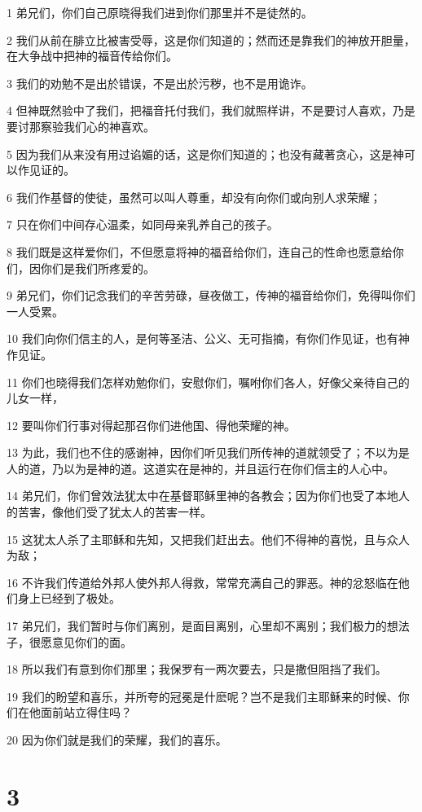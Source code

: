 \par 1 弟兄们，你们自己原晓得我们进到你们那里并不是徒然的。
\par 2 我们从前在腓立比被害受辱，这是你们知道的；然而还是靠我们的神放开胆量，在大争战中把神的福音传给你们。
\par 3 我们的劝勉不是出於错误，不是出於污秽，也不是用诡诈。
\par 4 但神既然验中了我们，把福音托付我们，我们就照样讲，不是要讨人喜欢，乃是要讨那察验我们心的神喜欢。
\par 5 因为我们从来没有用过谄媚的话，这是你们知道的；也没有藏著贪心，这是神可以作见证的。
\par 6 我们作基督的使徒，虽然可以叫人尊重，却没有向你们或向别人求荣耀；
\par 7 只在你们中间存心温柔，如同母亲乳养自己的孩子。
\par 8 我们既是这样爱你们，不但愿意将神的福音给你们，连自己的性命也愿意给你们，因你们是我们所疼爱的。
\par 9 弟兄们，你们记念我们的辛苦劳碌，昼夜做工，传神的福音给你们，免得叫你们一人受累。
\par 10 我们向你们信主的人，是何等圣洁、公义、无可指摘，有你们作见证，也有神作见证。
\par 11 你们也晓得我们怎样劝勉你们，安慰你们，嘱咐你们各人，好像父亲待自己的儿女一样，
\par 12 要叫你们行事对得起那召你们进他国、得他荣耀的神。
\par 13 为此，我们也不住的感谢神，因你们听见我们所传神的道就领受了；不以为是人的道，乃以为是神的道。这道实在是神的，并且运行在你们信主的人心中。
\par 14 弟兄们，你们曾效法犹太中在基督耶稣里神的各教会；因为你们也受了本地人的苦害，像他们受了犹太人的苦害一样。
\par 15 这犹太人杀了主耶稣和先知，又把我们赶出去。他们不得神的喜悦，且与众人为敌；
\par 16 不许我们传道给外邦人使外邦人得救，常常充满自己的罪恶。神的忿怒临在他们身上已经到了极处。
\par 17 弟兄们，我们暂时与你们离别，是面目离别，心里却不离别；我们极力的想法子，很愿意见你们的面。
\par 18 所以我们有意到你们那里；我保罗有一两次要去，只是撒但阻挡了我们。
\par 19 我们的盼望和喜乐，并所夸的冠冕是什麽呢？岂不是我们主耶稣来的时候、你们在他面前站立得住吗？
\par 20 因为你们就是我们的荣耀，我们的喜乐。

\chapter{3}

